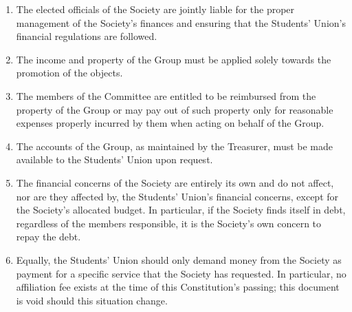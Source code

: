 \documentclass[12pt]{constitution}
\begin{document}
\label{article:financial-management}

\begin{enumerate}
    \item The elected officials of the Society are jointly liable for the proper management of the Society's finances and ensuring that the Students' Union’s financial regulations are followed.
    \item The income and property of the Group must be applied solely towards the promotion of the objects.
    \item The members of the Committee are entitled to be reimbursed from the property of the Group or may pay out of such property only for reasonable expenses properly incurred by them when acting on behalf of the Group.
    \item The accounts of the Group, as maintained by the Treasurer, must be made available to the Students' Union upon request.
    \item The financial concerns of the Society are entirely its own and do not affect, nor are they affected by, the Students' Union’s financial concerns, except for the Society’s allocated budget. In particular, if the Society finds itself in debt, regardless of the members responsible, it is the Society’s own concern to repay the debt.
    \item Equally, the Students' Union should only demand money from the Society as payment for a specific service that the Society has requested. In particular, no affiliation fee exists at the time of this Constitution’s passing; this document is void should this situation change.
\end{enumerate}


\label{article:irregularities-saving-provisions}
\end{document}
